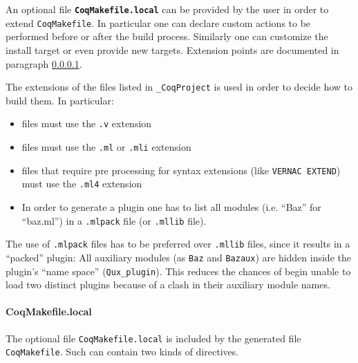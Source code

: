 An optional file {\bf {\tt CoqMakefile.local}} can be provided by the user in order to extend {\tt CoqMakefile}.  In particular one can declare custom actions to be performed before or after the build process. Similarly one can customize the install target or even provide new targets.  Extension points are documented in paragraph \ref{coqmakefile:local}.

The extensions of the files listed in {\tt \_CoqProject} is
used in order to decide how to build them.  In particular:

\begin{itemize}
\item {\Coq} files must use the \texttt{.v} extension
\item {\ocaml} files must use the \texttt{.ml} or \texttt{.mli} extension
\item {\ocaml} files that require pre processing for syntax extensions (like {\tt VERNAC EXTEND}) must use the \texttt{.ml4} extension
\item In order to generate a plugin one has to list all {\ocaml} modules (i.e. ``Baz'' for ``baz.ml'') in a \texttt{.mlpack} file (or \texttt{.mllib} file).
\end{itemize}

The use of \texttt{.mlpack} files has to be preferred over \texttt{.mllib}
files, since it results in a ``packed'' plugin: All auxiliary
modules (as {\tt Baz} and {\tt Bazaux}) are hidden inside
the plugin's ``name space'' ({\tt Qux\_plugin}).
This reduces the chances of begin unable to load two distinct plugins
because of a clash in their auxiliary module names.

\paragraph{CoqMakefile.local} %
\label{coqmakefile:local}

The optional file {\tt CoqMakefile.local} is included by the generated file
{\tt CoqMakefile}.  Such can contain two kinds of directives.

